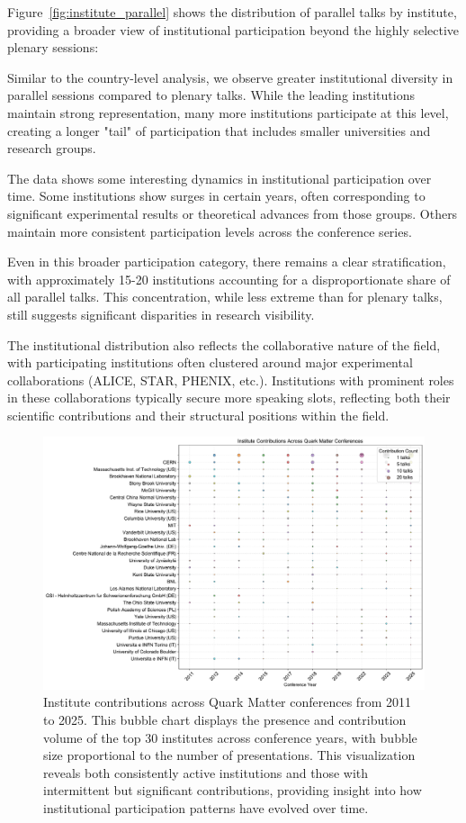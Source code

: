\documentclass[a4paper,11pt]{article}
\begin{document}
Figure~\ref{fig:institute_parallel} shows the distribution of parallel talks by institute, providing a broader view of institutional participation beyond the highly selective plenary sessions:

Similar to the country-level analysis, we observe greater institutional diversity in parallel sessions compared to plenary talks. While the leading institutions maintain strong representation, many more institutions participate at this level, creating a longer "tail" of participation that includes smaller universities and research groups.

The data shows some interesting dynamics in institutional participation over time. Some institutions show surges in certain years, often corresponding to significant experimental results or theoretical advances from those groups. Others maintain more consistent participation levels across the conference series.

Even in this broader participation category, there remains a clear stratification, with approximately 15-20 institutions accounting for a disproportionate share of all parallel talks. This concentration, while less extreme than for plenary talks, still suggests significant disparities in research visibility.

The institutional distribution also reflects the collaborative nature of the field, with participating institutions often clustered around major experimental collaborations (ALICE, STAR, PHENIX, etc.). Institutions with prominent roles in these collaborations typically secure more speaking slots, reflecting both their scientific contributions and their structural positions within the field.

\begin{figure}[H]
\centering
\includegraphics[width=\textwidth]{figures/institute_bubble_chart.pdf}
\caption{Institute contributions across Quark Matter conferences from 2011 to 2025. This bubble chart displays the presence and contribution volume of the top 30 institutes across conference years, with bubble size proportional to the number of presentations. This visualization reveals both consistently active institutions and those with intermittent but significant contributions, providing insight into how institutional participation patterns have evolved over time.}
\label{fig:institute_bubble}
\end{figure}
\end{document}
